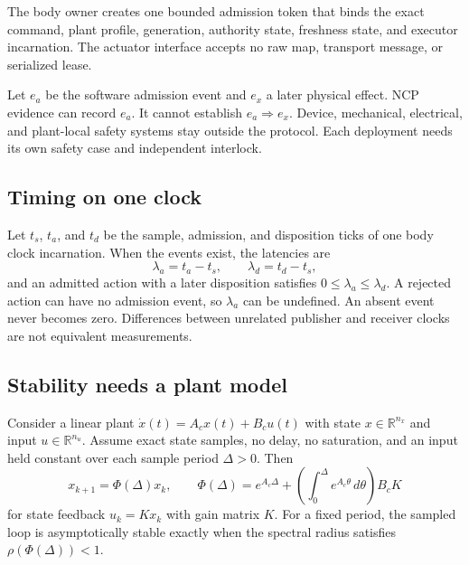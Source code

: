\documentclass[11pt,a4paper]{article}
\theoremstyle{definition}
\begin{document}

The body owner creates one bounded admission token that binds the exact command, plant
profile, generation, authority state, freshness state, and executor incarnation. The
actuator interface accepts no raw map, transport message, or serialized lease.

Let $e_a$ be the software admission event and $e_x$ a later physical effect. NCP
evidence can record $e_a$. It cannot establish $e_a\Rightarrow e_x$. Device,
mechanical, electrical, and plant-local safety systems stay outside the protocol. Each
deployment needs its own safety case and independent interlock.


\subsection{Timing on one clock}

Let $t_s$, $t_a$, and $t_d$ be the sample, admission, and disposition ticks of one body
clock incarnation. When the events exist, the latencies are
\begin{equation}\label{eq:latencies}
\lambda_a=t_a-t_s,\qquad \lambda_d=t_d-t_s,
\end{equation}
and an admitted action with a later disposition satisfies $0\leq\lambda_a\leq
\lambda_d$. A rejected action can have no admission event, so $\lambda_a$ can be
undefined. An absent event never becomes zero. Differences between unrelated
publisher and receiver clocks are not equivalent measurements.

\subsection{Stability needs a plant model}

Consider a linear plant $\dot x(t)=A_cx(t)+B_cu(t)$ with state $x\in\mathbb{R}^{n_x}$
and input $u\in\mathbb{R}^{n_u}$. Assume exact state samples, no delay, no
saturation, and an input held constant over each sample period $\Delta>0$. Then
\begin{equation}\label{eq:zoh}
x_{k+1}=\Phi(\Delta)x_k,\qquad
\Phi(\Delta)=e^{A_c\Delta}+\left(\int_0^\Delta e^{A_c\theta}\,d\theta\right)B_cK
\end{equation}
for state feedback $u_k=Kx_k$ with gain matrix $K$. For a fixed period, the sampled
loop is asymptotically stable exactly when the spectral radius satisfies
$\rho(\Phi(\Delta))<1$.
\end{document}
